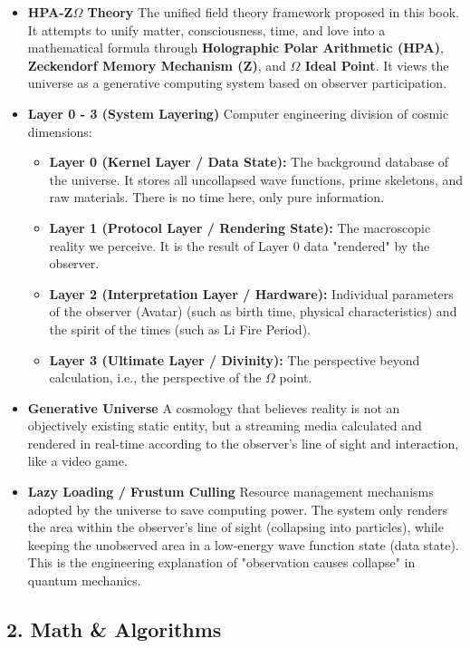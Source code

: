 \begin{itemize}
\item \textbf{HPA-Z$\Omega$ Theory}
The unified field theory framework proposed in this book. It attempts to unify matter, consciousness, time, and love into a mathematical formula through \textbf{Holographic Polar Arithmetic (HPA)}, \textbf{Zeckendorf Memory Mechanism (Z)}, and \textbf{$\Omega$ Ideal Point}. It views the universe as a generative computing system based on observer participation.

\item \textbf{Layer 0 - 3 (System Layering)}
Computer engineering division of cosmic dimensions:
\begin{itemize}
\item \textbf{Layer 0 (Kernel Layer / Data State):} The background database of the universe. It stores all uncollapsed wave functions, prime skeletons, and raw materials. There is no time here, only pure information.
\item \textbf{Layer 1 (Protocol Layer / Rendering State):} The macroscopic reality we perceive. It is the result of Layer 0 data "rendered" by the observer.
\item \textbf{Layer 2 (Interpretation Layer / Hardware):} Individual parameters of the observer (Avatar) (such as birth time, physical characteristics) and the spirit of the times (such as Li Fire Period).
\item \textbf{Layer 3 (Ultimate Layer / Divinity):} The perspective beyond calculation, i.e., the perspective of the $\Omega$ point.
\end{itemize}

\item \textbf{Generative Universe}
A cosmology that believes reality is not an objectively existing static entity, but a streaming media calculated and rendered in real-time according to the observer's line of sight and interaction, like a video game.

\item \textbf{Lazy Loading / Frustum Culling}
Resource management mechanisms adopted by the universe to save computing power. The system only renders the area within the observer's line of sight (collapsing into particles), while keeping the unobserved area in a low-energy wave function state (data state). This is the engineering explanation of "observation causes collapse" in quantum mechanics.
\end{itemize}

\subsection*{2. Math \& Algorithms}

